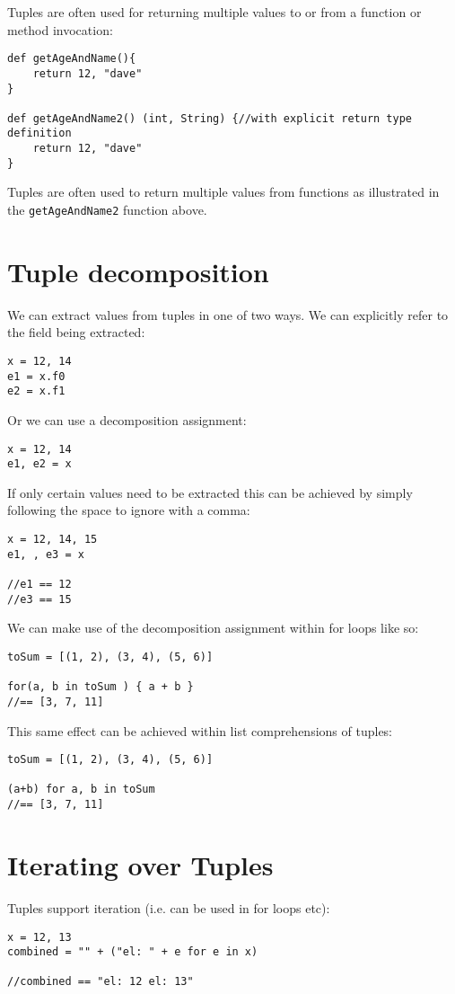 \documentclass[conc-doc]{subfiles}
\begin{document}
Tuples are often used for returning multiple values to or from a function or method invocation:
\begin{lstlisting}
def getAgeAndName(){
	return 12, "dave"
}

def getAgeAndName2() (int, String) {//with explicit return type definition
	return 12, "dave"
}
\end{lstlisting}

Tuples are often used to return multiple values from functions as illustrated in the \lstinline{getAgeAndName2} function above.

\section{Tuple decomposition}
We can extract values from tuples in one of two ways. We can explicitly refer to the field being extracted:
\begin{lstlisting}
x = 12, 14
e1 = x.f0
e2 = x.f1
\end{lstlisting}

Or we can use a decomposition assignment:
\begin{lstlisting}
x = 12, 14
e1, e2 = x
\end{lstlisting}

If only certain values need to be extracted this can be achieved by simply following the space to ignore with a comma:
\begin{lstlisting}
x = 12, 14, 15
e1, , e3 = x

//e1 == 12
//e3 == 15
\end{lstlisting}

We can make use of the decomposition assignment within for loops like so:
\begin{lstlisting}
toSum = [(1, 2), (3, 4), (5, 6)]

for(a, b in toSum ) { a + b }
//== [3, 7, 11]
\end{lstlisting}

This same effect can be achieved within list comprehensions of tuples:

\begin{lstlisting}
toSum = [(1, 2), (3, 4), (5, 6)]

(a+b) for a, b in toSum 
//== [3, 7, 11]
\end{lstlisting}

\section{Iterating over Tuples}
Tuples support iteration (i.e. can be used in for loops etc):
\begin{lstlisting}
x = 12, 13
combined = "" + ("el: " + e for e in x)

//combined == "el: 12 el: 13"
\end{lstlisting}
\end{document}
